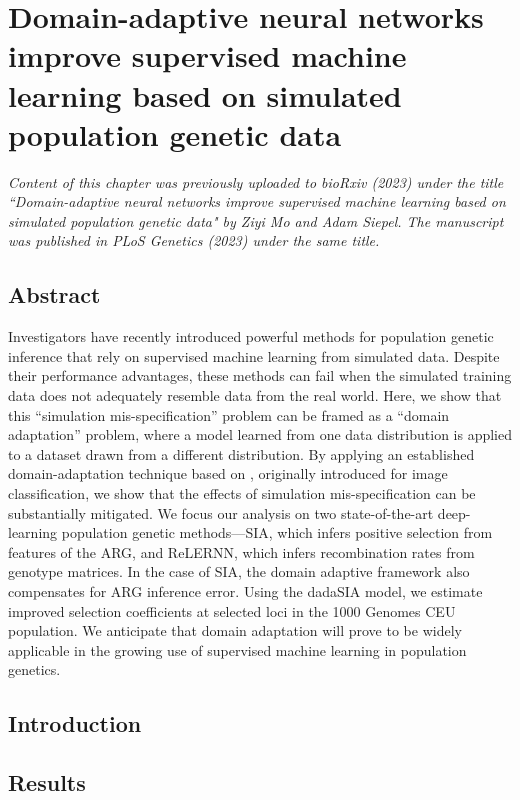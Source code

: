 \chapter{Domain-adaptive neural networks improve supervised machine learning based on simulated population genetic data}

\textit{Content of this chapter was previously uploaded to bioRxiv (2023) under the title ``Domain-adaptive neural networks improve supervised machine learning based on simulated population genetic data" by Ziyi Mo and Adam Siepel. The manuscript was published in PLoS Genetics (2023) under the same title.}

\section{Abstract}
Investigators have recently introduced powerful methods for population genetic inference that rely on supervised machine learning from simulated data. Despite their performance advantages, these methods can fail when the simulated training data does not adequately resemble data from the real world. Here, we show that this “simulation mis-specification” problem can be framed as a “domain adaptation” problem, where a model learned from one data distribution is applied to a dataset drawn from a different distribution. By applying an established domain-adaptation technique based on , originally introduced for image classification, we show that the effects of simulation mis-specification can be substantially mitigated. We focus our analysis on two state-of-the-art deep-learning population genetic methods—\ac{SIA}, which infers positive selection from features of the \acf{ARG}, and ReLERNN, which infers recombination rates from genotype matrices. In the case of \ac{SIA}, the domain adaptive framework also compensates for \ac{ARG} inference error. Using the \ac{dadaSIA} model, we estimate improved selection coefficients at selected loci in the 1000 Genomes CEU population. We anticipate that domain adaptation will prove to be widely applicable in the growing use of supervised machine learning in population genetics.

\section{Introduction}


\section{Results}

